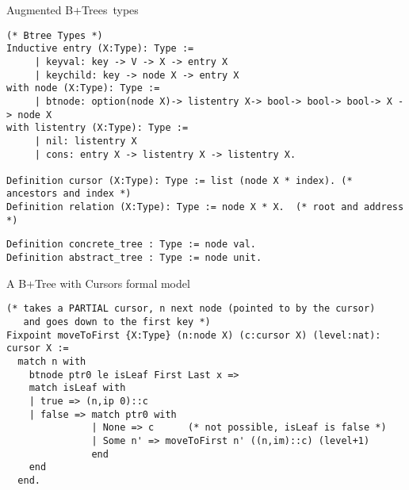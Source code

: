 \documentclass[page number,usenames,dvipsnames]{beamer}
\def\btrees{B+Trees}
\begin{document}
\begin{frame}[fragile]{Augmented \btrees\ types}

  \begin{lstlisting}[language=Coq,basicstyle=\scriptsize]
(* Btree Types *)
Inductive entry (X:Type): Type :=
     | keyval: key -> V -> X -> entry X
     | keychild: key -> node X -> entry X
with node (X:Type): Type :=
     | btnode: option(node X)-> listentry X-> bool-> bool-> bool-> X -> node X
with listentry (X:Type): Type :=
     | nil: listentry X
     | cons: entry X -> listentry X -> listentry X.

Definition cursor (X:Type): Type := list (node X * index). (* ancestors and index *)
Definition relation (X:Type): Type := node X * X.  (* root and address *)
  \end{lstlisting}
  \vfill
  \begin{lstlisting}[language=Coq]
Definition concrete_tree : Type := node val.
Definition abstract_tree : Type := node unit.
  \end{lstlisting}

  
\end{frame}

\begin{frame}[fragile]{A B+Tree with Cursors formal model}

  \begin{lstlisting}[language=Coq,basicstyle=\scriptsize]
(* takes a PARTIAL cursor, n next node (pointed to by the cursor)
   and goes down to the first key *)
Fixpoint moveToFirst {X:Type} (n:node X) (c:cursor X) (level:nat): cursor X :=
  match n with
    btnode ptr0 le isLeaf First Last x =>
    match isLeaf with
    | true => (n,ip 0)::c
    | false => match ptr0 with
               | None => c      (* not possible, isLeaf is false *)
               | Some n' => moveToFirst n' ((n,im)::c) (level+1)
               end
    end
  end.
\end{lstlisting}
  
\end{frame}
\end{document}
